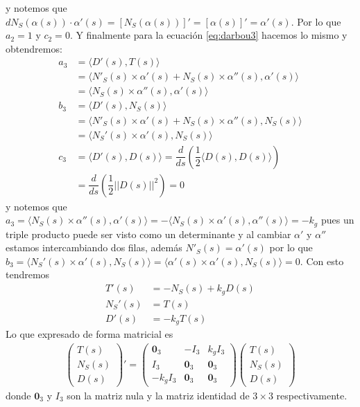 \documentclass[oneside,11pt]{memoir}
\begin{document}
    y notemos que $dN_S(\alpha(s))\cdot \alpha'(s)=\left[N_S(\alpha(s))\right]'=\left[\alpha(s)\right]'=\alpha'(s)$. Por lo que $a_2=1$ y $c_2=0$. Y finalmente para la ecuación \ref{eq:darbou3} hacemos lo mismo y obtendremos:
    \begin{align*}
        a_3&=\langle D'(s), T(s) \rangle\\
        &= \langle N'_S(s)\times \alpha'(s)+N_S(s)\times \alpha''(s), \alpha'(s) \rangle \\
        &= \langle N_S(s)\times \alpha''(s), \alpha'(s)\rangle\\
        b_3&=\langle D'(s), N_S(s) \rangle\\
        &= \langle N'_S(s)\times \alpha'(s)+N_S(s)\times \alpha''(s), N_S(s) \rangle \\ 
        &= \langle N_S'(s)\times \alpha'(s), N_S(s)\rangle \\
        c_3&=\langle D'(s), D(s) \rangle =\dfrac{d}{ds}\left( \dfrac{1}{2} \langle D(s), D(s) \rangle \right)\\
        &= \dfrac{d}{ds}\left( \dfrac{1}{2} ||D(s)||^2 \right)=0 
    \end{align*}
    y notemos que $a_3=\langle N_S(s)\times \alpha''(s), \alpha'(s)\rangle= -\langle N_S(s)\times \alpha'(s), \alpha''(s)\rangle= -k_g$ pues un triple producto puede ser visto como un determinante y al cambiar $\alpha'$ y $\alpha''$ estamos intercambiando dos filas, además $N'_S(s)=\alpha'(s)$ por lo que $b_3= \langle N_S'(s)\times \alpha'(s), N_S(s)\rangle = \langle \alpha'(s)\times \alpha'(s), N_S(s)\rangle =0$. Con esto tendremos
    \begin{align*}
        T'(s)&=-N_S(s)+k_gD(s)\\
        N_S'(s)&=T(s)\\
        D'(s)&=-k_gT(s)
    \end{align*}
    Lo que expresado de forma matricial es
    \begin{align*}
    \begin{pmatrix}
        T(s)\\
        N_S(s)\\
        D(s)
    \end{pmatrix}'
    =
    \begin{pmatrix}
       \textbf{0}_3 & -I_3 & k_gI_3\\
       I_3 & \textbf{0}_3 & \textbf{0}_3\\
       -k_gI_3& \textbf{0}_3 & \textbf{0}_3
    \end{pmatrix}
    \begin{pmatrix}
        T(s)\\
        N_S(s)\\
        D(s)
    \end{pmatrix}
    \end{align*}
    donde $\textbf{0}_3$ y $I_3$ son la matriz nula y la matriz identidad de $3\times 3$ respectivamente.\\
\end{document}
